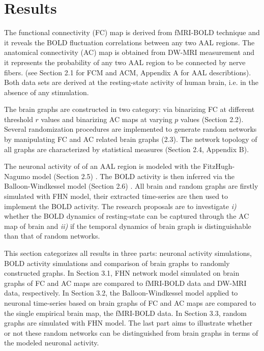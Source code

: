 
\chapter{Results} %

\label{Chapter3} %


The functional connectivity (FC) map is derived from fMRI-BOLD technique and it reveals the BOLD fluctuation correlations between any two AAL regions. The anatomical connectivity (AC) map is obtained from DW-MRI measurement and it represents the probability of any two AAL region to be connected by nerve fibers. (see Section 2.1 for FCM and ACM, Appendix A for AAL describtions). Both data sets are derived at the resting-state activity of human brain, i.e. in the absence of any stimulation.

The brain graphs are constructed in two category: via binarizing FC at different threshold $r$ values and binarizing AC maps at varying $p$ values (Section 2.2). Several randomization procedures are implemented to generate random networks by manipulating FC and AC related brain graphs (2.3). The network topology of all graphs are characterized by statistical measures (Section 2.4, Appendix B). 

The neuronal activity of of an AAL region is modeled with the FitzHugh-Nagumo model (Section 2.5) \citep{VUK13, GHO08a}. The BOLD activity is then inferred via the Balloon-Windkessel model (Section 2.6) \citep{FRI00}. All brain and random graphs are firstly simulated with FHN model, their extracted time-series are then used to implement the BOLD activity. The research proposals are to investigate \textit{i)} whether the BOLD dynamics of resting-state can be captured through the AC map of brain and \textit{ii)} if the temporal dynamics of brain graph is distinguishable than that of random networks.       

This section categorizes all results in three parts: neuronal activity simulations, BOLD activity simulations and comparison of brain graphs to randomly constructed graphs. In Section 3.1, FHN network model simulated on brain graphs of FC and AC maps are compared to fMRI-BOLD data and DW-MRI data, respectively. In Section 3.2, the Balloon-Windkessel model applied to neuronal time-series based on brain graphs of FC and AC maps are compared to the single empirical brain map, the fMRI-BOLD data. In Section 3.3, random graphs are simulated with FHN model. The last part aims to illustrate whether or not these random networks can be distinguished from brain graphs in terms of the modeled neuronal activity.  




